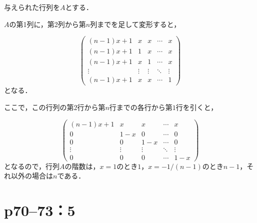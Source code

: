 \documentclass[a4paper,10pt,fleqn]{ltjsarticle}
\begin{document}
\begin{leftbar}
    与えられた行列を$A$とする．

    $A$の第1列に，第2列から第$n$列までを足して変形すると，

    \[
        \begin{pmatrix}
            (n-1)x+1 & x      & x      & \cdots & x      \\
            (n-1)x+1 & 1      & x      & \cdots & x      \\
            (n-1)x+1 & x      & 1      & \cdots & x      \\
            \vdots   & \vdots & \vdots & \ddots & \vdots \\
            (n-1)x+1 & x      & x      & \cdots & 1
        \end{pmatrix}
    \]
    となる．

    ここで，この行列の第$2$行から第$n$行までの各行から第$1$行を引くと，

    \[
        \begin{pmatrix}
            (n-1)x+1 & x      & x      & \cdots & x      \\
            0        & 1-x    & 0      & \cdots & 0      \\
            0        & 0      & 1-x    & \cdots & 0      \\
            \vdots   & \vdots & \vdots & \ddots & \vdots \\
            0        & 0      & 0      & \cdots & 1 -x
        \end{pmatrix}
    \]
    となるので，行列$A$の階数は，$x=1$のとき$1$，$ x= -1/(n-1)$のとき$n-1$，それ以外の場合は$n$である．
\end{leftbar}


\newpage

\section*{p70--73：5}
\end{document}
